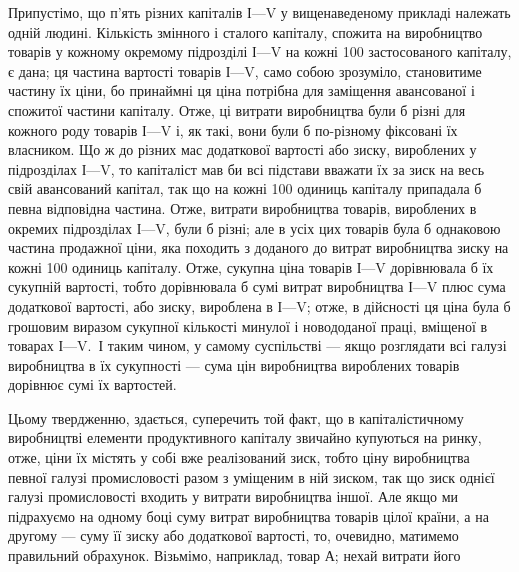 Припустімо, що п’ять різних капіталів І—V у вищенаведеному прикладі належать одній людині. Кількість
змінного і сталого капіталу, спожита на виробництво товарів у кожному окремому підрозділі І—V на
кожні 100 застосованого капіталу,
є дана; ця частина вартості товарів І—V, само собою зрозуміло, становитиме частину їх ціни, бо
принаймні ця ціна потрібна для заміщення авансованої і спожитої частини капіталу. Отже, ці витрати
виробництва були б різні для кожного роду
товарів І—V і, як такі, вони були б по-різному фіксовані їх власником. Що ж до різних мас додаткової
вартості або зиску, вироблених у підрозділах І—V, то капіталіст мав би всі підстави вважати їх за
зиск на весь свій авансований капітал, так що
на кожні 100 одиниць капіталу припадала б певна відповідна
частина. Отже, витрати виробництва товарів, вироблених в окремих підрозділах І—V, були б різні; але
в усіх цих товарів
була б однаковою частина продажної ціни, яка походить з доданого до витрат виробництва зиску на
кожні 100 одиниць капіталу. Отже, сукупна ціна товарів І—V дорівнювала б їх сукупній вартості, тобто
дорівнювала б сумі витрат виробництва
І—V плюс сума додаткової вартості, або зиску, вироблена в
І—V; отже, в дійсності ця ціна була б грошовим виразом сукупної кількості минулої і новододаної
праці, вміщеної в товарах
І—V.~І таким чином, у самому суспільстві — якщо розглядати
всі галузі виробництва в їх сукупності — сума цін виробництва
вироблених товарів дорівнює сумі їх вартостей.

Цьому твердженню, здається, суперечить той факт, що в
капіталістичному виробництві елементи продуктивного капіталу
звичайно купуються на ринку, отже, ціни їх містять у собі вже
реалізований зиск, тобто ціну виробництва певної галузі промисловості разом з уміщеним в ній зиском,
так що зиск однієї
галузі промисловості входить у витрати виробництва іншої.
Але якщо ми підрахуємо на одному боці суму витрат виробництва товарів цілої країни, а на другому —
суму її зиску або додаткової вартості, то, очевидно, матимемо правильний обрахунок. Візьмімо,
наприклад, товар $А$; нехай витрати його
\parbreak{}  %
